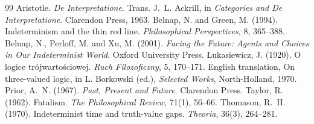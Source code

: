 \documentclass{situationist-preprint}
\begin{document}
\begin{thebibliography}{99}\small
{} Aristotle. \emph{De Interpretatione}. Trans. J.~L. Ackrill, in \emph{Categories and De Interpretatione}. Clarendon Press, 1963.
 Belnap, N. and Green, M. (1994). Indeterminism and the thin red line. \emph{Philosophical Perspectives}, 8, 365--388.
 Belnap, N., Perloff, M. and Xu, M. (2001). \emph{Facing the Future: Agents and Choices in Our Indeterminist World}. Oxford University Press.
 {\L}ukasiewicz, J. (1920). O logice tr\'ojwarto\'sciowej. \emph{Ruch Filozoficzny}, 5, 170--171. English translation, On three-valued logic, in L. Borkowski (ed.), \emph{Selected Works}, North-Holland, 1970.
 Prior, A.~N. (1967). \emph{Past, Present and Future}. Clarendon Press.
 Taylor, R. (1962). Fatalism. \emph{The Philosophical Review}, 71(1), 56--66.
 Thomason, R.~H. (1970). Indeterminist time and truth-value gaps. \emph{Theoria}, 36(3), 264--281.
\end{thebibliography}
\end{document}
